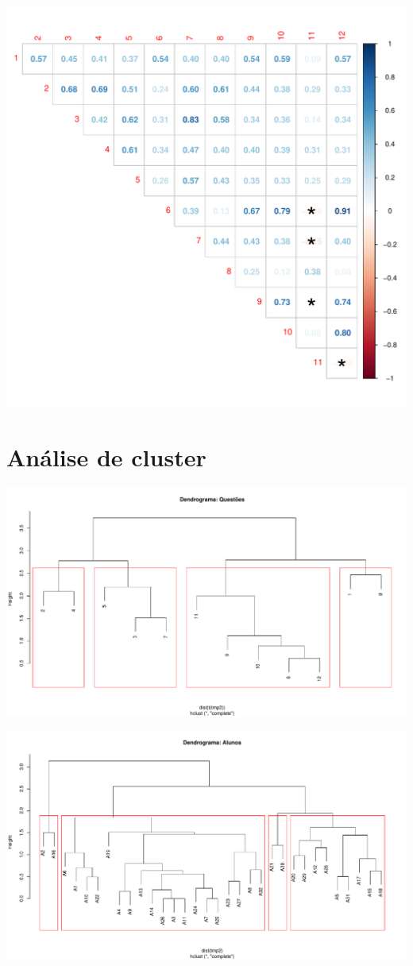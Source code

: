 \documentclass[
  landscape]{article}
\begin{document}
\begin{center}\includegraphics{analise_avaliacao_files/figure-latex/unnamed-chunk-2-1} \end{center}

\hypertarget{anuxe1lise-de-cluster}{%
\section{Análise de cluster}\label{anuxe1lise-de-cluster}}

\begin{center}\includegraphics{analise_avaliacao_files/figure-latex/unnamed-chunk-3-1} \end{center}

\begin{center}\includegraphics{analise_avaliacao_files/figure-latex/unnamed-chunk-3-2} \end{center}
\end{document}
